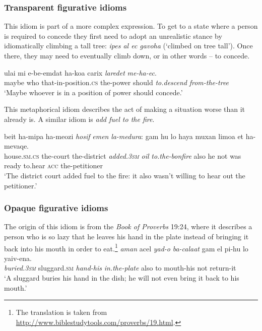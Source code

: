 \documentclass[output=paper]{langsci/langscibook}
\begin{document}
\subsubsection{Transparent figurative idioms}
This idiom is part of a more complex expression. To get to a state where a person is required to concede they first need to adopt an unrealistic stance by idiomatically climbing a tall tree: \textit{{\tet}ipes {\ayin}al {\ayin}ec gavoha} (`climbed on tree tall'). Once there, they may need to eventually climb down, or in other words -- to concede.

	\ea\label{she:ec-canon}
    	\gll {\alef}ulai mi {\shin}e-be-{\ayin}emdat ha-koa{\het} carix \textit{laredet} \textit{me-ha-{\ayin}ec}.\\
    	   maybe who that-in-position.\textsc{cs} the-power should \textit{to.descend} \textit{from-the-tree}\\
    	\glt `Maybe whoever is in a position of power should concede.'
	\z

This metaphorical idiom describes the act of making a situation worse than it already is. A similar  idiom is \textit{add fuel to the fire}.

	\ea\label{she:medura-canon}
    	\gll beit ha-mi{\shin}pa{\tet} ha-me{\het}ozi \textit{hosif} \textit{{\shin}emen} \textit{la-medura}: gam hu lo haya muxan li{\shin}mo{\ayin}a {\alef}et ha-mevaqe{\shin}.\\
    	   house.\textsc{sm}.\textsc{cs} the-court the-district \textit{added.\textsc{3sm}} \textit{oil} \textit{to.the-bonfire} also he not was ready to.hear \textsc{acc} the-petitioner\\
    	\glt `The district court added fuel to the fire: it also wasn't willing to hear out the petitioner.'
	\z

\subsubsection{Opaque figurative idioms}

The origin of this idiom is from the \textit{Book of Proverbs} 19:24, where it describes a person who is so lazy that he leaves his hand in the plate instead of bringing it back into his mouth in order to eat.\footnote{The translation is taken from \url{http://www.biblestudytools.com/proverbs/19.html}.}
    \ea\label{she:proverb}
        \gll \textit{{\tet}aman} {\ayin}acel \textit{yad-o} \textit{ba-cala{\het}at} gam {\alef}el pi-hu lo ya{\shin}iv-ena.\\
            \textit{buried.\textsc{3sm}} sluggard.\textsc{sm} \textit{hand-his} \textit{in.the-plate} also to mouth-his not return-it\\
        \glt `A sluggard buries his hand in the dish; he will not even bring it back to his mouth.'
    \z
\end{document}
